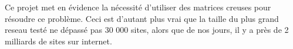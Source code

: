 Ce projet met en évidence la nécessité d'utiliser des matrices creuses pour résoudre ce problème. Ceci est d'autant plus vrai que la taille du plus grand reseau testé ne dépassé pas 30 000 sites, alors que de nos jours, il y a près de 2 milliards de sites sur internet.